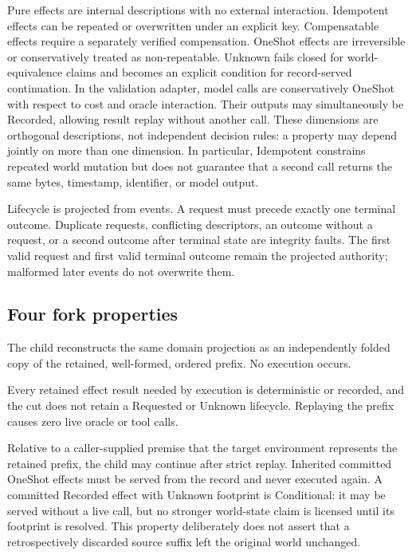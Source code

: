 Pure effects are internal descriptions with no external interaction.
Idempotent effects can be repeated or overwritten under an explicit key.
Compensatable effects require a separately verified compensation.  OneShot
effects are irreversible or conservatively treated as non-repeatable.  Unknown
fails closed for world-equivalence claims and becomes an explicit condition for
record-served continuation.  In the validation adapter, model calls are conservatively
OneShot with respect to cost and oracle interaction.  Their outputs may
simultaneously be Recorded, allowing result replay without another call.
These dimensions are orthogonal descriptions, not independent decision rules:
a property may depend jointly on more than one dimension.  In particular,
Idempotent constrains repeated world mutation but does not guarantee that a
second call returns the same bytes, timestamp, identifier, or model output.

Lifecycle is projected from events.  A request must precede exactly one
terminal outcome.  Duplicate requests, conflicting descriptors, an outcome
without a request, or a second outcome after terminal state are integrity
faults.  The first valid request and first valid terminal outcome remain the
projected authority; malformed later events do not overwrite them.

\subsection{Four fork properties}

\begin{definition}[ProjectionReplay]
The child reconstructs the same domain projection as an independently folded
copy of the retained, well-formed, ordered prefix.  No execution occurs.
\end{definition}

\begin{definition}[StrictExecutionReplay]
Every retained effect result needed by execution is deterministic or recorded,
and the cut does not retain a Requested or Unknown lifecycle.  Replaying the
prefix causes zero live oracle or tool calls.
\end{definition}

\begin{definition}[ExternalContinuation]
Relative to a caller-supplied premise that the target environment represents
the retained prefix, the child may continue after strict replay.  Inherited
committed OneShot effects must be served from the record and never executed
again.  A committed Recorded effect with Unknown footprint is Conditional: it
may be served without a live call, but no stronger world-state claim is licensed
until its footprint is resolved.  This property deliberately does not assert that a
retrospectively discarded source suffix left the original world unchanged.
\end{definition}

